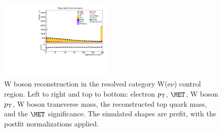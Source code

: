 \begin{figure}[tbp]
\begin{center}
    \includegraphics[width=0.48\textwidth]{figures/wlnhbb2016/resolved/WenWH2TopCR_pfmetsig.pdf}
    \caption{W boson reconstruction in the resolved category W(e$\nu$) \ttbar control region.
    Left to right and top to bottom: electron $p_{\mathrm{T}}$, $\MET$, W boson $p_{\mathrm{T}}$, W boson transverse mass,
    the reconstructed top quark mass, and the $\MET$ significance.
    The simulated shapes are prefit, with the postfit normalizations applied.}
    \label{fig:res_WenTT_WBosons}
  \end{center}
\end{figure}
\clearpage

